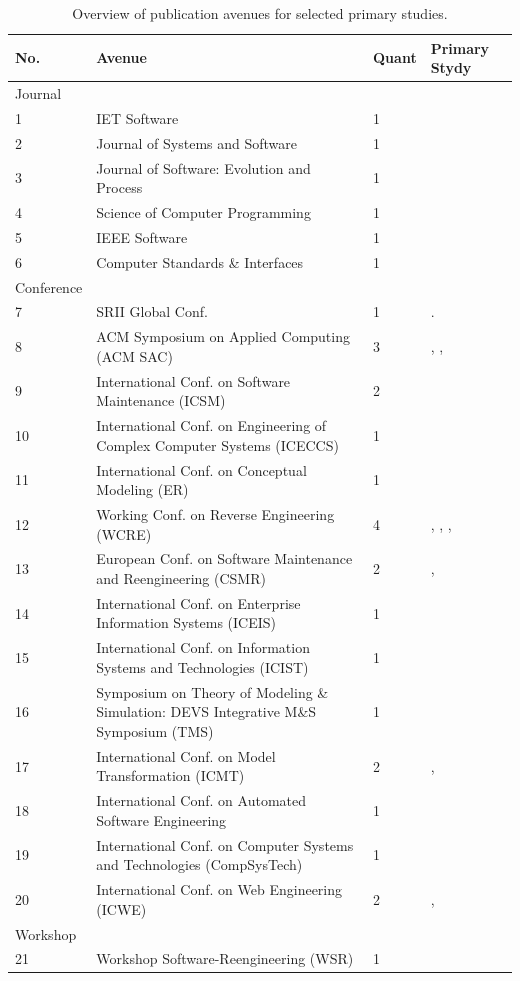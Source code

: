 \begin{table}
\scriptsize
\centering
\caption{Overview of publication avenues for selected primary studies.}
\begin{tabular}{|l|l|l|l|}
\hline 
\cellcolor{gray} No. & \cellcolor{gray}Avenue & \cellcolor{gray}Quant & \cellcolor{gray}Primary Stydy\tabularnewline

\hline 
\cellcolor{gray!25}Journal      \tabularnewline
\hline 
1 & IET Software & 1 & \cite{5871783}\tabularnewline
\hline 
2 & Journal of Systems and Software & 1 & \cite{PerezCastillo20121370}\tabularnewline
\hline 
3 & Journal of Software: Evolution and Process & 1 & \cite{SMR:SMR582}\tabularnewline
\hline 
4 & Science of Computer Programming & 1 & \cite{FuentesFernandez2012247}\tabularnewline
\hline 
5 & IEEE Software & 1 & \cite{5440163}\tabularnewline
\hline 
6 & Computer Standards \& Interfaces & 1 & \cite{PrezCastillo2011519}\tabularnewline
\hline 
\cellcolor{gray!25}Conference       \tabularnewline
\hline 
7 & SRII Global Conf. & 1 & \cite{6311013}. \cite{6080834}\tabularnewline
\hline 
8 & ACM Symposium on Applied Computing (ACM SAC) & 3 & \cite{Perez-Castillo:2012:IEL:2231936.2231949}, \cite{Perez-Castillo:2011:ECS:1982185.1982249},
\cite{delCastillo:2009:PRP:1529282.1529753}\tabularnewline
\hline 
9 & International Conf. on Software Maintenance (ICSM) & 2 & \cite{6080786}\tabularnewline
\hline 
10 & International Conf. on Engineering of Complex Computer Systems (ICECCS) & 1 & \cite{5773392}\tabularnewline
\hline 
11 & International Conf. on Conceptual Modeling (ER) & 1 & \cite{Mazon:2007:MDM:1784489.1784497}\tabularnewline
\hline 
12 & Working Conf. on Reverse Engineering (WCRE) & 4 & \cite{Guzman:2007:AAR:1339262.1339532}, \cite{5328801},
\cite{4400179}, \cite{6385130}\tabularnewline
\hline 
13 & European Conf. on Software Maintenance and Reengineering (CSMR) & 2 & \cite{5741334}, \cite{6498507}\tabularnewline
\hline 
14 & International Conf. on Enterprise Information Systems (ICEIS) & 1 & \cite{ICEISPerez:CastilloGCP12}\tabularnewline
\hline 
15 & International Conf. on Information Systems and Technologies (ICIST) & 1 & \cite{lastDAyOFMyLife}\tabularnewline
\hline 
16 & Symposium on Theory of Modeling \& Simulation: DEVS Integrative M\&S
Symposium (TMS) & 1 & \cite{Tu:2011:HRD:2048476.2048482}\tabularnewline
\hline 
17 & International Conf. on Model Transformation (ICMT) & 2 & \cite{Perez-Castillo:2010:IBP:1875847.1875861}, \cite{Fernandez-Ropero:2012:EAB:2367051.2367064}\tabularnewline
\hline 
18 & International Conf. on Automated Software Engineering & 1 & \cite{Bruneliere:2010:MGE:1858996.1859032}\tabularnewline
\hline 
19 & International Conf. on Computer Systems and Technologies (CompSysTech) & 1 & \cite{Normantas:2012:OKD:2383276.2383286}\tabularnewline
\hline 
20 & International Conf. on Web Engineering (ICWE) & 2 & \cite{Mainetti:2012:MMT:2364120.2364182}, \cite{Rodriguez-Echeverria:2011:MLW:2186508.2186536}\tabularnewline
\hline 
\cellcolor{gray!25}Workshop    \tabularnewline
\hline  
21 & Workshop Software-Reengineering (WSR) & 1 & \cite{cau15393}\tabularnewline
\hline 
\end{tabular}
\label{tab:avenue}
\end{table}

